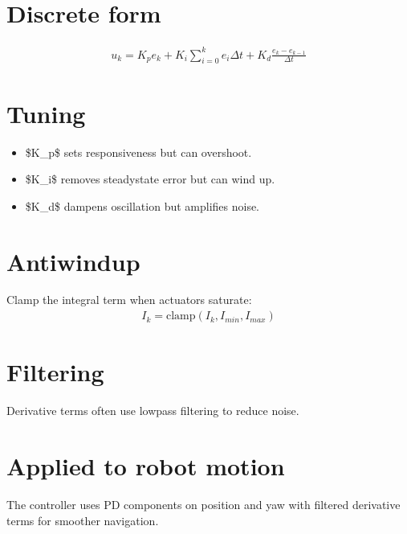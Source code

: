 \documentclass[letterpaper,10pt,english]{sphinxmanual}
\begin{document}
\section{Discrete form}
\label{\detokenize{appendix_l_pid_control:discrete-form}}\begin{equation*}
\begin{split}u_k = K_p e_k + K_i \sum_{i=0}^k e_i \Delta t + K_d \frac{e_k - e_{k-1}}{\Delta t}\end{split}
\end{equation*}

\section{Tuning}
\label{\detokenize{appendix_l_pid_control:tuning}}\begin{itemize}
\item {} 
\sphinxAtStartPar
\$K\_p\$ sets responsiveness but can overshoot.

\item {} 
\sphinxAtStartPar
\$K\_i\$ removes steady\sphinxhyphen{}state error but can wind up.

\item {} 
\sphinxAtStartPar
\$K\_d\$ dampens oscillation but amplifies noise.

\end{itemize}


\section{Anti\sphinxhyphen{}windup}
\label{\detokenize{appendix_l_pid_control:anti-windup}}
\sphinxAtStartPar
Clamp the integral term when actuators saturate:
\begin{equation*}
\begin{split}I_k = \text{clamp}(I_k, I_{min}, I_{max})\end{split}
\end{equation*}

\section{Filtering}
\label{\detokenize{appendix_l_pid_control:filtering}}
\sphinxAtStartPar
Derivative terms often use low\sphinxhyphen{}pass filtering to reduce noise.


\section{Applied to robot motion}
\label{\detokenize{appendix_l_pid_control:applied-to-robot-motion}}
\sphinxAtStartPar
The controller uses PD components on position and yaw with filtered derivative
terms for smoother navigation.
\end{document}
